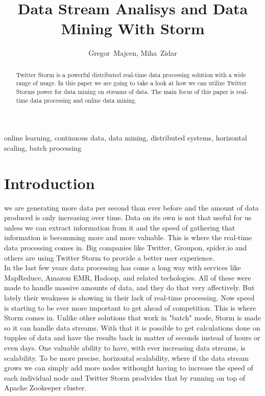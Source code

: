 \documentclass[journal]{IEEEtran/IEEEtran}
\begin{document}
\title{Data Stream Analisys and Data Mining With Storm}

\author{Gregor~Majcen, Miha~Zidar}%
\maketitle
\begin{abstract}
    Twitter Storm is a powerful distributed real-time data processing solution with a wide range of usage. In this paper we are going to take a look at how we can utilize Twitter Storms power for data mining on streams of data. The main focus of this paper is real-time data processing and online data mining.
\end{abstract}

\begin{IEEEkeywords}
    online learning, continuous data, data mining, distributed systems, horizontal scaling, batch processing
\end{IEEEkeywords}

\IEEEpeerreviewmaketitle


\section{Introduction}
 we are generating more data per second than ever before and the amount of data produced is only increasing over time. Data on its own is not that useful for us unless we can extract information from it and the speed of gathering that information is becomming more and more valuable. This is where the real-time data processing comes in. Big companies like Twitter, Groupon, spider.io and others are using Twitter Storm to provide a better user experience.\\

In the last few years data processing has come a long way with services like MapReduce, Amazon EMR, Hadoop, and related techologies. All of these were made to handle massive amounts of data, and they do that very affectively. But lately their weakness is showing in their lack of real-time processing. Now speed is starting to be ever more important to get ahead of competition. This is where Storm comes in. Unlike other solutions that work in "batch" mode, Storm is made so it can handle data streams. With that it is possible to get calculations done on tupples of data and have the results back in matter of seconds instead of hours or even days. One valuable ability to have, with ever increasing data streams, is scalability. To be more precise, horizontal scalability, where if the data stream grows we can simply add more nodes withought having to increase the speed of each individual node and Twitter Storm prodvides that by running on top of Apache Zookeeper cluster.
\end{document}
